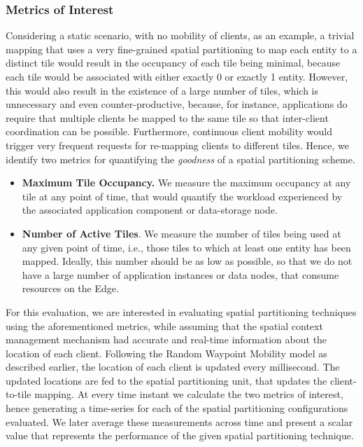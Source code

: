 \subsubsection{Metrics of Interest}
Considering a static scenario, with no mobility of clients, as an example, a trivial mapping that uses a very fine-grained spatial partitioning to map each entity to a distinct tile would result in the occupancy of each tile being minimal, because each tile would be associated with either exactly 0 or exactly 1 entity. However, this would also result in the existence of a large number of tiles, which is unnecessary and even counter-productive, because, for instance, applications do require that multiple clients be mapped to the same tile so that inter-client coordination can be possible. Furthermore, continuous client mobility would trigger very frequent requests for re-mapping clients to different tiles. Hence, we identify two metrics for quantifying the \textit{goodness} of a spatial partitioning scheme. 
\begin{itemize}
\item \textbf{Maximum Tile Occupancy.} We measure the maximum occupancy at any tile at any point of time, that would quantify the workload experienced by the associated application component or data-storage node. 
\item \textbf{Number of Active Tiles}. We measure the number of tiles being used at any given point of time, i.e., those tiles to which at least one entity has been mapped. Ideally, this number should be as low as possible, so that we do not have a large number of application instances or data nodes, that consume resources on the Edge.
\end{itemize}
\par For this evaluation, we are interested in evaluating spatial partitioning techniques using the aforementioned metrics, while assuming that the spatial context management mechanism had accurate and real-time information about the location of each client. Following the Random Waypoint Mobility model as described earlier, the location of each client is updated every millisecond. The updated locations are fed to the spatial partitioning unit, that updates the client-to-tile mapping. At every time instant we calculate the two metrics of interest, hence generating a time-series for each of the spatial partitioning configurations evaluated. We later average these measurements across time and present a scalar value that represents the performance of the given spatial partitioning technique.

